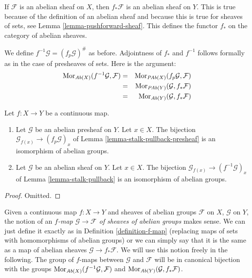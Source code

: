 \medskip\noindent
If $\mathcal{F}$ is an abelian sheaf on $X$, then $f_*\mathcal{F}$
is an abelian sheaf on $Y$. This is true because of the definition
of an abelian sheaf and because this is true for sheaves of sets,
see Lemma \ref{lemma-pushforward-sheaf}. This defines the functor
$f_*$ on the category of abelian sheaves.

\medskip\noindent
We define $f^{-1}\mathcal{G} = (f_p\mathcal{G})^\#$ as before.
Adjointness of $f_*$ and $f^{-1}$ follows formally as in
the case of presheaves of sets. Here is the argument:
\begin{eqnarray*}
\mathop{\mathrm{Mor}}\nolimits_{\textit{Ab}(X)}(f^{-1}\mathcal{G}, \mathcal{F})
& = &
\mathop{\mathrm{Mor}}\nolimits_{\textit{PAb}(X)}(f_p\mathcal{G}, \mathcal{F}) \\
& = &
\mathop{\mathrm{Mor}}\nolimits_{\textit{PAb}(Y)}(\mathcal{G}, f_*\mathcal{F}) \\
& = &
\mathop{\mathrm{Mor}}\nolimits_{\textit{Ab}(Y)}(\mathcal{G}, f_*\mathcal{F})
\end{eqnarray*}

\begin{lemma}
\label{lemma-pullback-abelian-stalk}
Let $f : X \to Y$ be a continuous map.
\begin{enumerate}
\item Let $\mathcal{G}$ be an abelian presheaf on $Y$.
Let $x \in X$. The bijection
$\mathcal{G}_{f(x)} \to (f_p\mathcal{G})_x$ of
Lemma \ref{lemma-stalk-pullback-presheaf} is an isomorphism of abelian groups.
\item Let $\mathcal{G}$ be an abelian sheaf on $Y$.
Let $x \in X$. The bijection
$\mathcal{G}_{f(x)} \to (f^{-1}\mathcal{G})_x$ of
Lemma \ref{lemma-stalk-pullback} is an isomorphism of abelian groups.
\end{enumerate}
\end{lemma}

\begin{proof}
Omitted.
\end{proof}

\noindent
Given a continuous map $f : X \to Y$ and sheaves of abelian
groups $\mathcal{F}$ on $X$, $\mathcal{G}$ on $Y$, the notion
of an {\it $f$-map $\mathcal{G} \to \mathcal{F}$
of sheaves of abelian groups} makes sense. We can just define
it exactly as in Definition \ref{definition-f-map} (replacing maps
of sets with homomorphisms of abelian groups) or we can
simply say that it is the same as a map of abelian
sheaves $\mathcal{G} \to f_*\mathcal{F}$. We will use this
notion freely in the following. The group of $f$-maps between
$\mathcal{G}$ and $\mathcal{F}$ will be in canonical bijection
with the groups
$\mathop{\mathrm{Mor}}\nolimits_{\textit{Ab}(X)}(f^{-1}\mathcal{G}, \mathcal{F})$
and
$\mathop{\mathrm{Mor}}\nolimits_{\textit{Ab}(Y)}(\mathcal{G}, f_*\mathcal{F})$.

